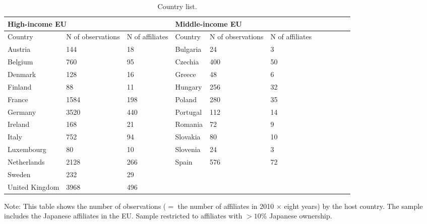 \begin{table}[ht]
\centering
\caption{Country list.\label{tab:country-list}}
\centering
    \centering
    \begin{tabular}{lllllllllll}
    \hline
\multicolumn{3}{l}{High-income EU} & \multicolumn{3}{l}{Middle-income EU} \\
\hline
Country & N of observations & N of affiliates  & Country & N of observations & N of affiliates \\ \hline
Austria & 144 & 18 & Bulgaria & 24 & 3 \\
Belgium & 760 & 95 & Czechia & 400 & 50 \\
Denmark & 128 & 16 & Greece & 48 & 6 \\
Finland & 88 & 11 & Hungary & 256 & 32 \\
France & 1584 & 198 & Poland & 280 & 35 \\
Germany & 3520 & 440 & Portugal & 112 & 14 \\
Ireland & 168 & 21 & Romania & 72 & 9 \\
Italy & 752 & 94 & Slovakia & 80 & 10 \\
Luxembourg & 80 & 10 & Slovenia & 24 & 3 \\
Netherlands & 2128 & 266 & Spain & 576 & 72 \\
Sweden & 232 & 29 & & & \\
United Kingdom & 3968 & 496 & & & \\
        \hline
    \end{tabular}

\begin{flushleft}
Note: This table shows the number of observations ($=$ the number of affiliates in 2010 $\times$ eight years) by the host country. The sample includes the Japanese affiliates in the EU.
Sample restricted to affiliates with $>10$\% Japanese ownership.
\end{flushleft}
\end{table}
